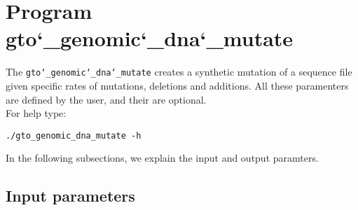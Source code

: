 \section{Program gto\char`_genomic\char`_dna\char`_mutate}
The \texttt{gto\char`_genomic\char`_dna\char`_mutate} creates a synthetic mutation of a sequence file given specific rates of mutations, deletions and additions. All these paramenters are defined by the user, and their are optional.\\
For help type:
\begin{lstlisting}
./gto_genomic_dna_mutate -h
\end{lstlisting}
In the following subsections, we explain the input and output paramters.

\subsection*{Input parameters}

